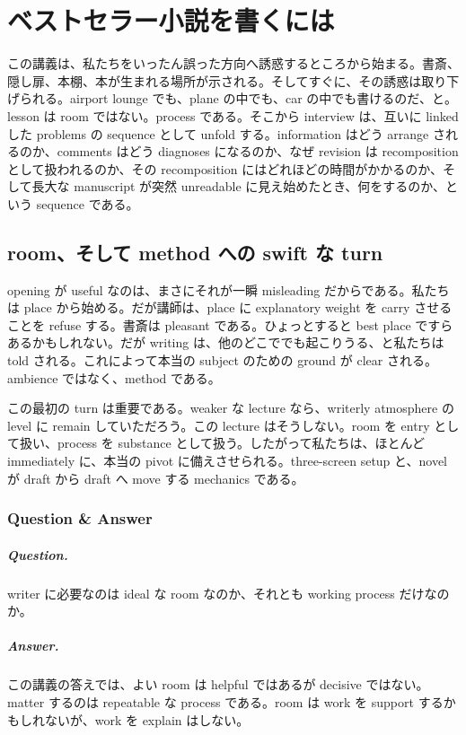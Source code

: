 \chapter{ベストセラー小説を書くには}

この講義は、私たちをいったん誤った方向へ誘惑するところから始まる。書斎、隠し扉、本棚、本が生まれる場所が示される。そしてすぐに、その誘惑は取り下げられる。airport lounge でも、plane の中でも、car の中でも書けるのだ、と。lesson は room ではない。process である。そこから interview は、互いに linked した problems の sequence として unfold する。information はどう arrange されるのか、comments はどう diagnoses になるのか、なぜ revision は recomposition として扱われるのか、その recomposition にはどれほどの時間がかかるのか、そして長大な manuscript が突然 unreadable に見え始めたとき、何をするのか、という sequence である。

\section{room、そして method への swift な turn}

opening が useful なのは、まさにそれが一瞬 misleading だからである。私たちは place から始める。だが講師は、place に explanatory weight を carry させることを refuse する。書斎は pleasant である。ひょっとすると best place ですらあるかもしれない。だが writing は、他のどこででも起こりうる、と私たちは told される。これによって本当の subject のための ground が clear される。ambience ではなく、method である。

この最初の turn は重要である。weaker な lecture なら、writerly atmosphere の level に remain していただろう。この lecture はそうしない。room を entry として扱い、process を substance として扱う。したがって私たちは、ほとんど immediately に、本当の pivot に備えさせられる。three-screen setup と、novel が draft から draft へ move する mechanics である。

\subsection{Question \& Answer}

\paragraph{Question.} writer に必要なのは ideal な room なのか、それとも working process だけなのか。

\paragraph{Answer.} この講義の答えでは、よい room は helpful ではあるが decisive ではない。matter するのは repeatable な process である。room は work を support するかもしれないが、work を explain はしない。

